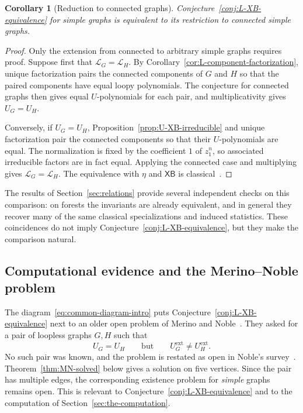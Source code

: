 \documentclass[11pt]{article}
\theoremstyle{plain}
\newtheorem{corollary}[theorem]{Corollary}
\theoremstyle{definition}
\renewcommand{\mathcal}{\mathscr}
\newcommand{\LL}{\mathcal{L}}    %
\newcommand{\XB}{\mathsf{XB}} %
\newcommand{\ext}{\mathrm{ext}}
\numberwithin{equation}{section}
\begin{document}
\begin{corollary}[Reduction to connected graphs]
\label{cor:connected-reduction}
Conjecture~\ref{conj:L-XB-equivalence} for simple graphs is equivalent to its
restriction to connected simple graphs.
\end{corollary}

\begin{proof}
Only the extension from connected to arbitrary simple graphs requires proof.
Suppose first that $\LL_G=\LL_H$.  By
Corollary~\ref{cor:L-component-factorization}, unique factorization pairs the
connected components of $G$ and $H$ so that the paired components have equal
loopy polynomials.  The conjecture for connected graphs then gives equal
$U$-polynomials for each pair, and multiplicativity gives $U_G=U_H$.

Conversely, if $U_G=U_H$, Proposition~\ref{prop:U-XB-irreducible} and unique
factorization pair the connected components so that their $U$-polynomials
are equal.  The normalization is fixed by the coefficient $1$ of $z_1^n$, so
associated irreducible factors are in fact equal.  Applying the connected
case and multiplying gives $\LL_G=\LL_H$.  The equivalence with $\eta$ and
$\XB$ is classical~\cite{NW,Sar,MN,Nob}.
\end{proof}

The results of Section~\ref{sec:relations} provide several independent checks
on this comparison: on forests the invariants are already equivalent, and in
general they recover many of the same classical specializations and induced
statistics.  These coincidences do not imply
Conjecture~\ref{conj:L-XB-equivalence}, but they make the comparison natural.

\subsection{Computational evidence and the Merino--Noble problem}\label{sec:extended-U}

The diagram~\eqref{eq:common-diagram-intro} puts Conjecture~\ref{conj:L-XB-equivalence}
next to an older open problem of Merino and Noble~\cite{MN}.
They asked for a pair of loopless graphs $G,H$ such that
\begin{equation}\label{eq:MN-open-problem}
   U_G=U_H
   \qquad\text{but}\qquad
   U_G^{\ext}\ne U_H^{\ext}.
\end{equation}
No such pair was known, and the problem is restated as open in Noble's
survey~\cite[\S26.7]{Nob}.  Theorem~\ref{thm:MN-solved} below gives a solution on five vertices.
Since the pair has multiple edges, the corresponding existence problem for \emph{simple} graphs remains open.
This is relevant to Conjecture~\ref{conj:L-XB-equivalence} and to the computation of Section~\ref{sec:the-computation}.
\end{document}
